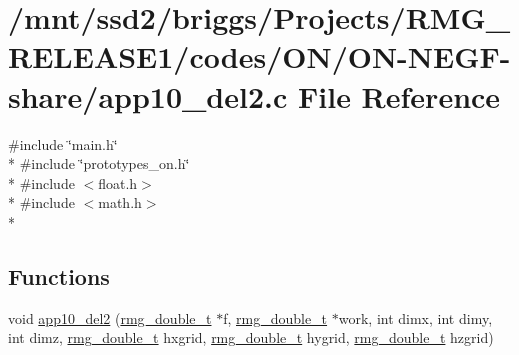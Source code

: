 \hypertarget{_o_n_2_o_n-_n_e_g_f-share_2app10__del2_8c}{\section{/mnt/ssd2/briggs/\-Projects/\-R\-M\-G\-\_\-\-R\-E\-L\-E\-A\-S\-E1/codes/\-O\-N/\-O\-N-\/\-N\-E\-G\-F-\/share/app10\-\_\-del2.c File Reference}
\label{_o_n_2_o_n-_n_e_g_f-share_2app10__del2_8c}
}
{\ttfamily \#include \char`\"{}main.\-h\char`\"{}}\\*
{\ttfamily \#include \char`\"{}prototypes\-\_\-on.\-h\char`\"{}}\\*
{\ttfamily \#include $<$float.\-h$>$}\\*
{\ttfamily \#include $<$math.\-h$>$}\\*
\subsection*{Functions}
\begin{DoxyCompactItemize}
\item 
void \hyperlink{_o_n_2_o_n-_n_e_g_f-share_2app10__del2_8c_a4a4c03dc0a4c327b8a3dde52de117ed7}{app10\-\_\-del2} (\hyperlink{rmgtypes_8h_aaa16921c14f121c56eaa42390a340db8}{rmg\-\_\-double\-\_\-t} $\ast$f, \hyperlink{rmgtypes_8h_aaa16921c14f121c56eaa42390a340db8}{rmg\-\_\-double\-\_\-t} $\ast$work, int dimx, int dimy, int dimz, \hyperlink{rmgtypes_8h_aaa16921c14f121c56eaa42390a340db8}{rmg\-\_\-double\-\_\-t} hxgrid, \hyperlink{rmgtypes_8h_aaa16921c14f121c56eaa42390a340db8}{rmg\-\_\-double\-\_\-t} hygrid, \hyperlink{rmgtypes_8h_aaa16921c14f121c56eaa42390a340db8}{rmg\-\_\-double\-\_\-t} hzgrid)
\end{DoxyCompactItemize}


